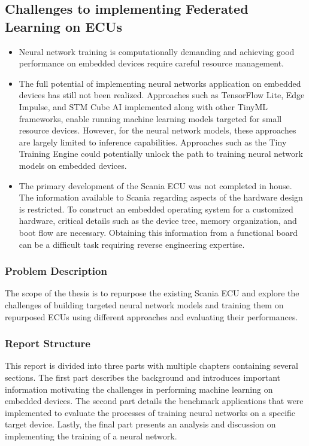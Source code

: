 \subsection*{Challenges to implementing Federated Learning on ECUs}

\begin{itemize}
	\item Neural network training is computationally demanding and achieving good performance on embedded devices require careful resource management.
	\item The full potential of implementing neural networks application on embedded devices has still not been realized. Approaches such as TensorFlow Lite, Edge Impulse, and STM Cube AI implemented along with other TinyML frameworks, enable running machine learning models targeted for small resource devices. However, for the neural network models, these approaches are largely limited to inference capabilities. Approaches such as the Tiny Training Engine could potentially unlock the path to training neural network models on embedded devices.
	\item The primary development of the Scania ECU was not completed in house. The information available to Scania regarding aspects of the hardware design is restricted. To construct an embedded operating system for a customized hardware, critical details such as the device tree, memory organization, and boot flow are necessary. Obtaining this information from a functional board can be a difficult task requiring reverse engineering expertise.
\end{itemize}

\subsubsection{Problem Description}


The scope of the thesis is to repurpose the existing Scania ECU and explore the challenges of building targeted neural network models and training them on repurposed ECUs using different approaches and evaluating their performances.

\subsubsection{Report Structure}

This report is divided into three parts with multiple chapters containing several sections. The first part describes the background and introduces important information motivating the challenges in performing machine learning on embedded devices. The second part details the benchmark applications that were implemented to evaluate the processes of training neural networks on a specific target device. Lastly, the final part presents an analysis and discussion on implementing the training of a neural network.


